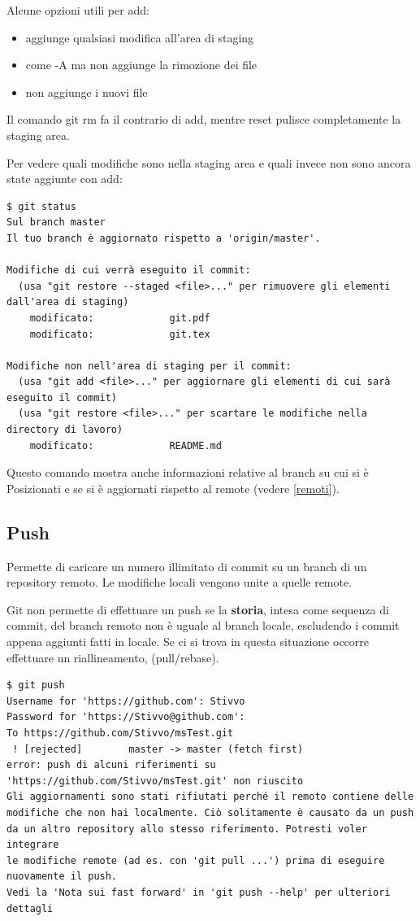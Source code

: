 \documentclass{article} \usepackage[textwidth=19cm,textheight=24cm]{geometry}
\begin{document}
Alcune opzioni utili per add:

\begin{itemize}
    \item {} aggiunge qualsiasi modifica all'area di staging
    \item {} come -A ma non aggiunge la rimozione dei file
    \item {} non aggiunge i nuovi file
\end{itemize}

Il comando git rm fa il contrario di add, mentre reset pulisce completamente la
staging area.

Per vedere quali modifiche sono nella staging area e quali invece non sono
ancora state aggiunte con add:

\begin{verbatim}
$ git status
Sul branch master
Il tuo branch è aggiornato rispetto a 'origin/master'.

Modifiche di cui verrà eseguito il commit:
  (usa "git restore --staged <file>..." per rimuovere gli elementi dall'area di staging)
	modificato:             git.pdf
	modificato:             git.tex

Modifiche non nell'area di staging per il commit:
  (usa "git add <file>..." per aggiornare gli elementi di cui sarà eseguito il commit)
  (usa "git restore <file>..." per scartare le modifiche nella directory di lavoro)
	modificato:             README.md
\end{verbatim}

Questo comando mostra anche informazioni relative al branch su cui si è
Posizionati e se si è aggiornati rispetto al remote (vedere \ref{remoti}).

\subsection{Push}

Permette di caricare un numero illimitato di commit su un branch di un
repository remoto. Le modifiche locali vengono unite a quelle remote.

Git non permette di effettuare un push se la \textbf{storia}, intesa come sequenza di commit,
del branch remoto non è uguale al branch locale, escludendo i commit
appena aggiunti fatti in locale. Se ci si trova in questa situazione occorre effettuare un riallineamento,
(pull/rebase).

\begin{verbatim}
$ git push
Username for 'https://github.com': Stivvo
Password for 'https://Stivvo@github.com':
To https://github.com/Stivvo/msTest.git
 ! [rejected]        master -> master (fetch first)
error: push di alcuni riferimenti su 'https://github.com/Stivvo/msTest.git' non riuscito
Gli aggiornamenti sono stati rifiutati perché il remoto contiene delle
modifiche che non hai localmente. Ciò solitamente è causato da un push
da un altro repository allo stesso riferimento. Potresti voler integrare
le modifiche remote (ad es. con 'git pull ...') prima di eseguire
nuovamente il push.
Vedi la 'Nota sui fast forward' in 'git push --help' per ulteriori
dettagli
\end{verbatim}
\end{document}
